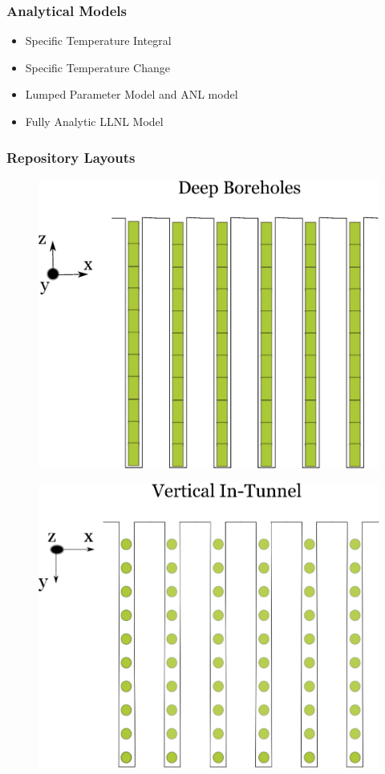 
\begin{frame}[ctb!]
  \frametitle{Analytical Models}
  \begin{itemize}
    \item Specific Temperature Integral 
    \item Specific Temperature Change 
    \item Lumped Parameter Model and ANL model
    \item Fully Analytic LLNL Model
  \end{itemize}
\end{frame}


\begin{frame}
  \frametitle{Repository Layouts}
  \begin{minipage}{0.3\textwidth}
    \begin{figure}[h!]
      \includegraphics[width=\textwidth]{boreholes.eps}
    \end{figure}
    \begin{figure}[h!]
      \includegraphics[width=\textwidth]{vertical.eps}

\end{figure}
\end{minipage}
\end{frame}

